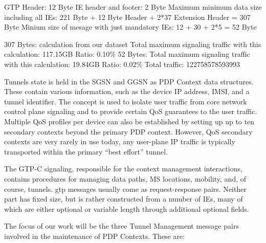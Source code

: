 GTP Header: 12 Byte
IE header and footer: 2 Byte
Maximum minimum data size including all \glspl{IE}: 221 Byte + 12 Byte Header + 2*37 Extension Header = 307 Byte
Minium size of mesage with just mandatory \glspl{IE}: 12 + 30 + 2*5 = 52 Byte

307 Bytes:
calculation from our dataset
Total maximum signaling traffic with this calculation: 117.15GB
Ratio: 0.10\%
52 Bytes:
Total maximum signaling traffic with this calculation: 19.84GB
Ratio: 0.02\%
Total traffic: 122758578593993

Tunnels state is held in the \gls{SGSN} and \gls{GGSN} as \gls{PDP} Context data structures. These contain various information, such as the device IP address, \gls{IMSI}, and a tunnel identifier. The concept is used to isolate user traffic from core network control plane signaling and to provide certain \gls{QoS} guarantees to the user traffic. Multiple \gls{QoS} profiles per device can also be established by setting up up to ten secondary contexts beyond the primary PDP context. However, \gls{QoS} secondary contexts are very rarely in use today, any user-plane IP traffic is typically transported within the primary ``best effort'' tunnel.

The GTP-C signaling, responsible for the context management interactions, contains procedures for managing data paths, \gls{MS} locations, mobility, and, of course, tunnels. \gls{gtp} messages usually come as request-response pairs. Neither part has fixed size, but is rather constructed from a number of \glspl{IE}, many of which are either optional or variable length through additional optional fields.

The focus of our work will be the three Tunnel Management message pairs involved in the maintenance of PDP Contexts. These are:

